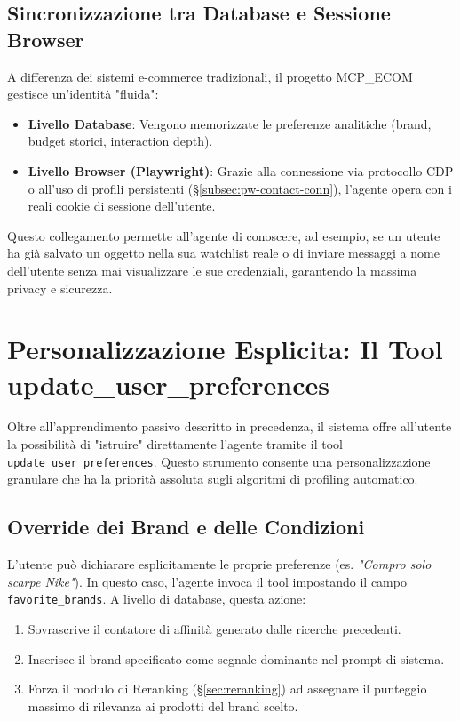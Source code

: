 \subsection{Sincronizzazione tra Database e Sessione Browser}
\label{subsec:profiling-sync}

A differenza dei sistemi e-commerce tradizionali, il progetto MCP\_ECOM gestisce un'identità "fluida":
\begin{itemize}
    \item \textbf{Livello Database}: Vengono memorizzate le preferenze analitiche (brand, budget storici, interaction depth).
    \item \textbf{Livello Browser (Playwright)}: Grazie alla connessione via protocollo CDP o all'uso di profili persistenti (\S\ref{subsec:pw-contact-conn}), l'agente opera con i reali cookie di sessione dell'utente.
\end{itemize}

Questo collegamento permette all'agente di conoscere, ad esempio, se un utente ha già salvato un oggetto nella sua watchlist reale o di inviare messaggi a nome dell'utente senza mai visualizzare le sue credenziali, garantendo la massima privacy e sicurezza.

\section{Personalizzazione Esplicita: Il Tool update\_user\_preferences}
\label{sec:profiling-manual}

Oltre all'apprendimento passivo descritto in precedenza, il sistema offre all'utente la possibilità di "istruire" direttamente l'agente tramite il tool \texttt{update\_user\_preferences}. Questo strumento consente una personalizzazione granulare che ha la priorità assoluta sugli algoritmi di profiling automatico.

\subsection{Override dei Brand e delle Condizioni}
\label{subsec:profiling-brand-custom}

L'utente può dichiarare esplicitamente le proprie preferenze (es. \textit{"Compro solo scarpe Nike"}). In questo caso, l'agente invoca il tool impostando il campo \texttt{favorite\_brands}. 
A livello di database, questa azione:
\begin{enumerate}
    \item Sovrascrive il contatore di affinità generato dalle ricerche precedenti.
    \item Inserisce il brand specificato come segnale dominante nel prompt di sistema.
    \item Forza il modulo di Reranking (\S\ref{sec:reranking}) ad assegnare il punteggio massimo di rilevanza ai prodotti del brand scelto.
\end{enumerate}

